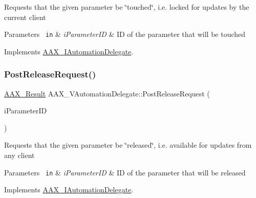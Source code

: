 Requests that the given parameter be \char`\"{}touched\char`\"{}, i.\+e. locked for updates by the current client


\begin{DoxyParams}[1]{Parameters}
\mbox{\texttt{ in}}  & {\em i\+Parameter\+ID} & ID of the parameter that will be touched \\
\hline
\end{DoxyParams}


Implements \mbox{\hyperlink{a01773_a30fdb67042b8dc9fb42fa9023ed9cce0}{A\+A\+X\+\_\+\+I\+Automation\+Delegate}}.

\mbox{\label{a01893_a2808e1e38836349f6e51d72e0219cfe4}} 
\subsubsection{\texorpdfstring{PostReleaseRequest()}{PostReleaseRequest()}}
{\footnotesize\ttfamily \mbox{\hyperlink{a00392_a4d8f69a697df7f70c3a8e9b8ee130d2f}{A\+A\+X\+\_\+\+Result}} A\+A\+X\+\_\+\+V\+Automation\+Delegate\+::\+Post\+Release\+Request (\begin{DoxyParamCaption}\item[{\mbox{\hyperlink{a00392_a1440c756fe5cb158b78193b2fc1780d1}{A\+A\+X\+\_\+\+C\+Param\+ID}}}]{i\+Parameter\+ID }\end{DoxyParamCaption})\hspace{0.3cm}{\ttfamily [virtual]}}

Requests that the given parameter be \char`\"{}released\char`\"{}, i.\+e. available for updates from any client


\begin{DoxyParams}[1]{Parameters}
\mbox{\texttt{ in}}  & {\em i\+Parameter\+ID} & ID of the parameter that will be released \\
\hline
\end{DoxyParams}


Implements \mbox{\hyperlink{a01773_a89049fae2c35a4b99cfeb6585898bb69}{A\+A\+X\+\_\+\+I\+Automation\+Delegate}}.

\mbox{\label{a01893_a4268eba9f5d1e7c0e163d0c4071dcaf3}} 
